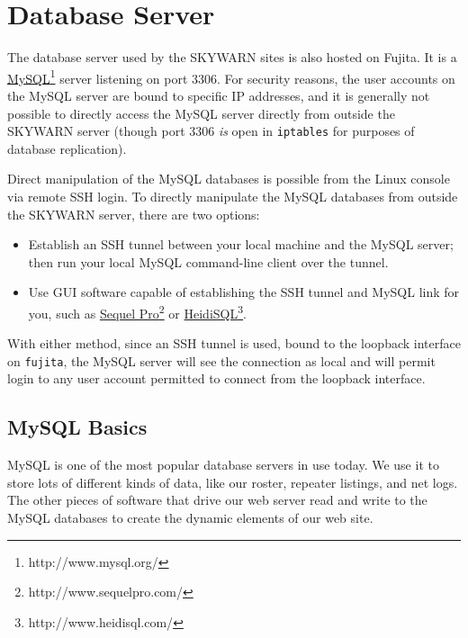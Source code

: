 \documentclass[pdflatex,letterpaper,twoside,12pt]{book}
\begin{document}

\section{Database Server}\label{database-server}

The database server used by the SKYWARN sites is also hosted on Fujita.  It is a \href{http://www.mysql.org}{MySQL}\footnote{http://www.mysql.org/} server listening on port 3306.  For security reasons, the user accounts on the MySQL server are bound to specific IP addresses, and it is generally not possible to directly access the MySQL server directly from outside the SKYWARN server (though port 3306 \emph{is} open in \texttt{iptables} for purposes of database replication).

Direct manipulation of the MySQL databases is possible from the Linux console via remote SSH login.  To directly manipulate the MySQL databases from outside the SKYWARN server, there are two options:

\begin{itemize}
\item Establish an SSH tunnel between your local machine and the MySQL server;  then run your local MySQL command-line client over the tunnel.

\item Use GUI software capable of establishing the SSH tunnel and MySQL link for you, such as \href{http://www.sequelpro.com/}{Sequel Pro}\footnote{http://www.sequelpro.com/} or \href{http://www.heidisql.com/}{HeidiSQL}\footnote{http://www.heidisql.com/}.
\end{itemize}

With either method, since an SSH tunnel is used, bound to the loopback interface on \texttt{fujita}, the MySQL server will see the connection as local and will permit login to any user account permitted to connect from the loopback interface.

\subsection{MySQL Basics}

MySQL is one of the most popular database servers in use today.  We use it to store lots of different kinds of data, like our roster, repeater listings, and net logs.  The other pieces of software that drive our web server read and write to the MySQL databases to create the dynamic elements of our web site.
\end{document}
